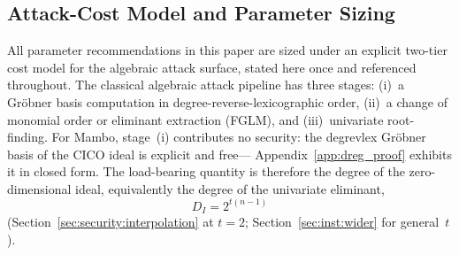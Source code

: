 \documentclass[11pt,a4paper]{article}
\theoremstyle{definition}
\begin{document}
\subsection{Attack-Cost Model and Parameter Sizing}\label{sec:security:costmodel}

All parameter recommendations in this paper are sized under an
explicit two-tier cost model for the algebraic attack surface, stated
here once and referenced throughout. The classical algebraic attack
pipeline has three stages: (i)~a Gr\"obner basis computation in
degree-reverse-lexicographic order, (ii)~a change of monomial order or
eliminant extraction (FGLM), and (iii)~univariate root-finding. For
Mambo, stage~(i) contributes no security: the degrevlex Gr\"obner
basis of the CICO ideal is explicit and free---
Appendix~\ref{app:dreg_proof} exhibits it in closed form. The
load-bearing quantity is therefore the degree of the zero-dimensional
ideal, equivalently the degree of the univariate eliminant,
\[
  D_I = 2^{t(n-1)}
\]
(Section~\ref{sec:security:interpolation} at $t = 2$;
Section~\ref{sec:inst:wider} for general~$t$).
\end{document}

